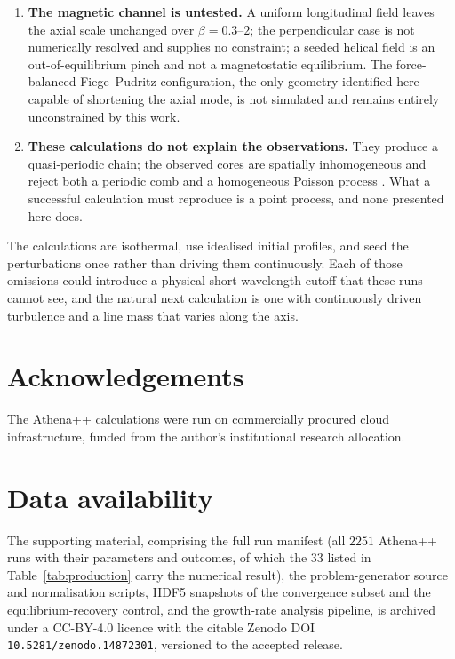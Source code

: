 \documentclass[usenatbib,twoside,twocolumn]{mnras}
\begin{document}
\begin{enumerate}
\item \textbf{The magnetic channel is untested.} A uniform longitudinal field leaves the axial scale unchanged over $\beta=0.3$--$2$; the perpendicular case is not numerically resolved and supplies no constraint; a seeded helical field is an out-of-equilibrium pinch and not a magnetostatic equilibrium. The force-balanced Fiege--Pudritz configuration, the only geometry identified here capable of shortening the axial mode, is not simulated and remains entirely unconstrained by this work.
\item \textbf{These calculations do not explain the observations.} They produce a quasi-periodic chain; the observed cores are spatially inhomogeneous and reject both a periodic comb and a homogeneous Poisson process \citep{PaperI}. What a successful calculation must reproduce is a point process, and none presented here does.
\end{enumerate}

The calculations are isothermal, use idealised initial profiles, and seed the perturbations once rather than driving them continuously. Each of those omissions could introduce a physical short-wavelength cutoff that these runs cannot see, and the natural next calculation is one with continuously driven turbulence and a line mass that varies along the axis.

\section*{Acknowledgements}

The Athena++ calculations were run on commercially procured cloud infrastructure, funded from the author's institutional research allocation.

\section*{Data availability}

The supporting material, comprising the full run manifest (all $2251$ Athena++ runs with their parameters and outcomes, of which the $33$ listed in Table~\ref{tab:production} carry the numerical result), the problem-generator source and normalisation scripts, HDF5 snapshots of the convergence subset and the equilibrium-recovery control, and the growth-rate analysis pipeline, is archived under a CC-BY-4.0 licence with the citable Zenodo DOI \texttt{10.5281/zenodo.14872301}, versioned to the accepted release.


\end{document}
